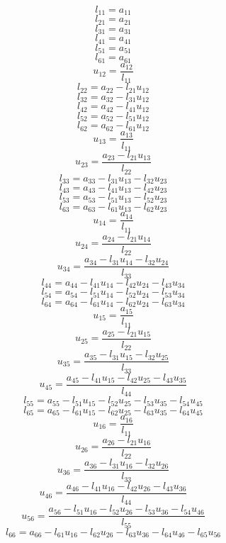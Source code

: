 \documentclass[10pt,a4paper,dvipdfmx]{article}
\begin{document}
\begin{multicols}{2}
\vfill\null
\columnbreak
$$ l_{{1}{1}} = a_{{1}{1}} $$
$$ l_{{2}{1}} = a_{{2}{1}} $$
$$ l_{{3}{1}} = a_{{3}{1}} $$
$$ l_{{4}{1}} = a_{{4}{1}} $$
$$ l_{{5}{1}} = a_{{5}{1}} $$
$$ l_{{6}{1}} = a_{{6}{1}} $$
$$ u_{{1}{2}} = \dfrac{a_{{1}{2}}}{l_{{1}{1}}} $$
$$ l_{{2}{2}} = a_{{2}{2}}- l_{{2}{1}} u_{{1}{2}} $$
$$ l_{{3}{2}} = a_{{3}{2}}- l_{{3}{1}} u_{{1}{2}} $$
$$ l_{{4}{2}} = a_{{4}{2}}- l_{{4}{1}} u_{{1}{2}} $$
$$ l_{{5}{2}} = a_{{5}{2}}- l_{{5}{1}} u_{{1}{2}} $$
$$ l_{{6}{2}} = a_{{6}{2}}- l_{{6}{1}} u_{{1}{2}} $$
$$ u_{{1}{3}} = \dfrac{a_{{1}{3}}}{l_{{1}{1}}} $$
$$ u_{{2}{3}} = \dfrac{a_{{2}{3}}- l_{{2}{1}} u_{{1}{3}}}{l_{{2}{2}}} $$
$$ l_{{3}{3}} = a_{{3}{3}}- l_{{3}{1}} u_{{1}{3}}- l_{{3}{2}} u_{{2}{3}} $$
$$ l_{{4}{3}} = a_{{4}{3}}- l_{{4}{1}} u_{{1}{3}}- l_{{4}{2}} u_{{2}{3}} $$
$$ l_{{5}{3}} = a_{{5}{3}}- l_{{5}{1}} u_{{1}{3}}- l_{{5}{2}} u_{{2}{3}} $$
$$ l_{{6}{3}} = a_{{6}{3}}- l_{{6}{1}} u_{{1}{3}}- l_{{6}{2}} u_{{2}{3}} $$
$$ u_{{1}{4}} = \dfrac{a_{{1}{4}}}{l_{{1}{1}}} $$
$$ u_{{2}{4}} = \dfrac{a_{{2}{4}}- l_{{2}{1}} u_{{1}{4}}}{l_{{2}{2}}} $$
$$ u_{{3}{4}} = \dfrac{a_{{3}{4}}- l_{{3}{1}} u_{{1}{4}}- l_{{3}{2}} u_{{2}{4}}}{l_{{3}{3}}} $$
$$ l_{{4}{4}} = a_{{4}{4}}- l_{{4}{1}} u_{{1}{4}}- l_{{4}{2}} u_{{2}{4}}- l_{{4}{3}} u_{{3}{4}} $$
$$ l_{{5}{4}} = a_{{5}{4}}- l_{{5}{1}} u_{{1}{4}}- l_{{5}{2}} u_{{2}{4}}- l_{{5}{3}} u_{{3}{4}} $$
$$ l_{{6}{4}} = a_{{6}{4}}- l_{{6}{1}} u_{{1}{4}}- l_{{6}{2}} u_{{2}{4}}- l_{{6}{3}} u_{{3}{4}} $$
$$ u_{{1}{5}} = \dfrac{a_{{1}{5}}}{l_{{1}{1}}} $$
$$ u_{{2}{5}} = \dfrac{a_{{2}{5}}- l_{{2}{1}} u_{{1}{5}}}{l_{{2}{2}}} $$
$$ u_{{3}{5}} = \dfrac{a_{{3}{5}}- l_{{3}{1}} u_{{1}{5}}- l_{{3}{2}} u_{{2}{5}}}{l_{{3}{3}}} $$
$$ u_{{4}{5}} = \dfrac{a_{{4}{5}}- l_{{4}{1}} u_{{1}{5}}- l_{{4}{2}} u_{{2}{5}}- l_{{4}{3}} u_{{3}{5}}}{l_{{4}{4}}} $$
$$ l_{{5}{5}} = a_{{5}{5}}- l_{{5}{1}} u_{{1}{5}}- l_{{5}{2}} u_{{2}{5}}- l_{{5}{3}} u_{{3}{5}}- l_{{5}{4}} u_{{4}{5}} $$
$$ l_{{6}{5}} = a_{{6}{5}}- l_{{6}{1}} u_{{1}{5}}- l_{{6}{2}} u_{{2}{5}}- l_{{6}{3}} u_{{3}{5}}- l_{{6}{4}} u_{{4}{5}} $$
$$ u_{{1}{6}} = \dfrac{a_{{1}{6}}}{l_{{1}{1}}} $$
$$ u_{{2}{6}} = \dfrac{a_{{2}{6}}- l_{{2}{1}} u_{{1}{6}}}{l_{{2}{2}}} $$
$$ u_{{3}{6}} = \dfrac{a_{{3}{6}}- l_{{3}{1}} u_{{1}{6}}- l_{{3}{2}} u_{{2}{6}}}{l_{{3}{3}}} $$
$$ u_{{4}{6}} = \dfrac{a_{{4}{6}}- l_{{4}{1}} u_{{1}{6}}- l_{{4}{2}} u_{{2}{6}}- l_{{4}{3}} u_{{3}{6}}}{l_{{4}{4}}} $$
$$ u_{{5}{6}} = \dfrac{a_{{5}{6}}- l_{{5}{1}} u_{{1}{6}}- l_{{5}{2}} u_{{2}{6}}- l_{{5}{3}} u_{{3}{6}}- l_{{5}{4}} u_{{4}{6}}}{l_{{5}{5}}} $$
$$ l_{{6}{6}} = a_{{6}{6}}- l_{{6}{1}} u_{{1}{6}}- l_{{6}{2}} u_{{2}{6}}- l_{{6}{3}} u_{{3}{6}}- l_{{6}{4}} u_{{4}{6}}- l_{{6}{5}} u_{{5}{6}} $$
\end{multicols}
\end{document}
